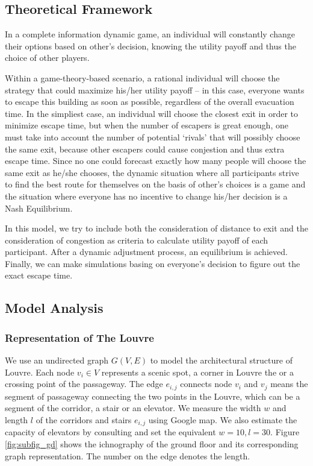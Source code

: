 \documentclass{mcmthesis}
\begin{document}
	\subsection{Theoretical Framework}
	       In a complete information dynamic game, an individual will constantly change their options based on other’s decision, knowing the utility payoff and thus the choice of other players. 
	
	Within a game-theory-based scenario, a rational individual will choose the strategy that could maximize his/her utility payoff – in this case, everyone wants to escape this building as soon as possible, regardless of the overall evacuation time. In the simpliest case, an individual will choose the closest exit in order to minimize escape time, but when the number of escapers is great enough, one must take into account the number of potential ‘rivals’ that will possibly choose the same exit, because other escapers could cause conjestion and thus extra escape time. Since no one could forecast exactly how many people will choose the same exit as he/she chooses, the dynamic situation where all participants strive to find the best route for themselves on the basis of other’s choices is a game and the situation where everyone has no incentive to change his/her decision is a Nash Equilibrium.  
	
	
	       In this model, we try to include both the consideration of distance to exit and the consideration of congestion as criteria to calculate utility payoff of each participant. After a dynamic adjustment process, an equilibrium is achieved. Finally, we can make simulations basing on everyone's decision to figure out the exact escape time.
	
	\subsection{Model Analysis}
			\subsubsection{Representation of The Louvre}
	
			We use an undirected graph $G(V,E)$ to model the architectural structure of Louvre. Each node $v_i \in V$ represents a scenic spot, a corner in Louvre the or a crossing point of the passageway. The edge $e_{i,j}$ connects node $v_i$ and $v_j$ means the segment of passageway connecting the two points in the Louvre, which can be a segment of the corridor, a stair or an elevator. We measure the width $w$ and length $l$ of the corridors and stairs $e_{i,j}$ using Google map. We also estimate the capacity of elevators by consulting \cite{xu2009staircase} and set the equivalent $w = 10, l = 30$.  Figure \ref{fig:subfig_gd} shows the ichnography of the ground floor and its corresponding graph representation. The number on the edge denotes the length.
			
\end{document}
